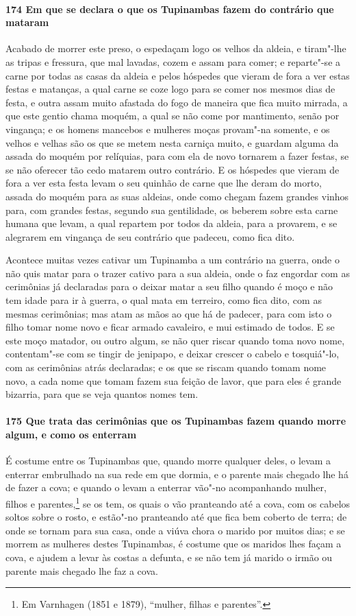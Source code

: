 \begin{linenumbers}
\paragraph{174 Em que se declara o que os Tupinambas fazem do contrário que mataram}\quad
Acabado de morrer este preso, o espedaçam logo os velhos da aldeia, e tiram"-lhe as tripas
e fressura, que mal lavadas, cozem e assam para comer; e reparte"-se a carne por todas as
casas da aldeia e pelos hóspedes que vieram de fora a ver estas festas e matanças, a qual
carne se coze logo para se comer nos mesmos dias de festa, e outra assam muito afastada do
fogo de maneira que fica muito mirrada, a que este gentio chama moquém, a qual se não come
por mantimento, senão por vingança; e os homens mancebos e mulheres moças provam"-na
somente, e os velhos e velhas são os que se metem nesta carniça muito, e guardam alguma da
assada do moquém por relíquias, para com ela de novo tornarem a fazer festas, se se não
oferecer tão cedo matarem outro contrário. E os hóspedes que vieram de fora a ver esta
festa levam o seu quinhão de carne que lhe deram do morto, assada do moquém para as suas
aldeias, onde como chegam fazem grandes vinhos para, com grandes festas, segundo sua
gentilidade, os beberem sobre esta carne humana que levam, a qual repartem por todos da
aldeia, para a provarem, e se alegrarem em vingança de seu contrário que padeceu, como
fica dito.

Acontece muitas vezes cativar um Tupinamba a um contrário na guerra, onde o não quis matar
para o trazer cativo para a sua aldeia, onde o faz engordar com as cerimônias já
declaradas para o deixar matar a seu filho quando é moço e não tem idade para ir à guerra,
o qual mata em terreiro, como fica dito, com as mesmas cerimônias; mas atam as mãos ao que
há de padecer, para com isto o filho tomar nome novo e ficar armado cavaleiro, e mui
estimado de todos. E se este moço matador, ou outro algum, se não quer riscar quando toma
novo nome, contentam"-se com se tingir de jenipapo, e deixar crescer o cabelo e tosquiá"-lo,
com as cerimônias atrás declaradas; e os que se riscam quando tomam nome novo, a cada nome
que tomam fazem sua feição de lavor, que para eles é grande bizarria, para que se veja
quantos nomes tem.

\paragraph{175 Que trata das cerimônias que os Tupinambas fazem quando morre algum, e como
os enterram}\quad
É costume entre os Tupinambas que, quando morre qualquer deles, o levam a enterrar
embrulhado na sua rede em que dormia, e o parente mais chegado lhe há de fazer a cova; e
quando o levam a enterrar vão"-no acompanhando mulher, filhos e parentes,\footnote{ Em
Varnhagen (1851 e 1879), ``mulher, filhas e parentes''.} se os tem, os quais o vão
pranteando até a cova, com os cabelos soltos sobre o rosto, e estão"-no pranteando até que
fica bem coberto de terra; de onde se tornam para sua casa, onde a viúva chora o marido
por muitos dias; e se morrem as mulheres destes Tupinambas, é costume que os maridos lhes
façam a cova, e ajudem a levar às costas a defunta, e se não tem já marido o irmão ou
parente mais chegado lhe faz a cova.


\end{linenumbers}
